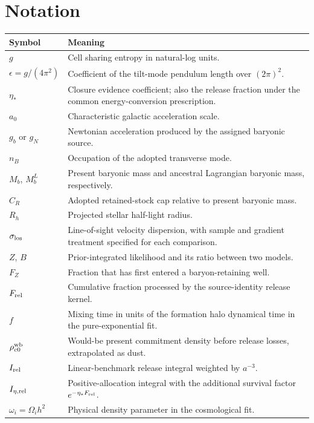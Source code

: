 \section{Notation}
\small
\begin{tabularx}{\textwidth}{P{.23\textwidth}Y}
\toprule Symbol & Meaning \\
\midrule
$g$ & Cell sharing entropy in natural-log units. \\
$\epsilon=g/(4\pi^2)$ & Coefficient of the tilt-mode pendulum length over $(2\pi)^2$. \\
$\eta_*$ & Closure evidence coefficient; also the release fraction under
the common energy-conversion prescription. \\
$a_0$ & Characteristic galactic acceleration scale. \\
$g_b$ or $g_N$ & Newtonian acceleration produced by the assigned baryonic
source. \\
$n_B$ & Occupation of the adopted transverse mode. \\
$M_b$, $M_b^L$ & Present baryonic mass and ancestral Lagrangian baryonic
mass, respectively. \\
$C_R$ & Adopted retained-stock cap relative to present baryonic mass. \\
$R_h$ & Projected stellar half-light radius. \\
$\sigma_{\rm los}$ & Line-of-sight velocity dispersion, with sample and
gradient treatment specified for each comparison. \\
$Z$, $B$ & Prior-integrated likelihood and its ratio between two models. \\
$F_Z$ & Fraction that has first entered a baryon-retaining well. \\
$F_{\rm rel}$ & Cumulative fraction processed by the source-identity
release kernel. \\
$f$ & Mixing time in units of the formation halo dynamical time in the
pure-exponential fit. \\
$\rho_{c0}^{\rm wb}$ & Would-be present commitment density before release
losses, extrapolated as dust. \\
$I_{\rm rel}$ & Linear-benchmark release integral weighted by $a^{-3}$. \\
$I_{\eta,\rm rel}$ & Positive-allocation integral with the additional
survival factor $e^{-\eta_*F_{\rm rel}}$. \\
$\omega_i=\Omega_i h^2$ & Physical density parameter in the cosmological
fit. \\
\bottomrule
\end{tabularx}
\normalsize
